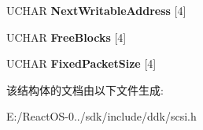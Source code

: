 \begin{DoxyCompactItemize}
U\+C\+H\+AR {\bfseries Next\+Writable\+Address} \mbox{[}4\mbox{]}
\item 
\mbox{\label{struct___t_r_a_c_k___i_n_f_o_r_m_a_t_i_o_n_a4725654dca55e4bee17f53da2cf9e42f}} 
U\+C\+H\+AR {\bfseries Free\+Blocks} \mbox{[}4\mbox{]}
\item 
\mbox{\label{struct___t_r_a_c_k___i_n_f_o_r_m_a_t_i_o_n_a634258f22bd9189def53ac173656807b}} 
U\+C\+H\+AR {\bfseries Fixed\+Packet\+Size} \mbox{[}4\mbox{]}
\end{DoxyCompactItemize}


该结构体的文档由以下文件生成\+:\begin{DoxyCompactItemize}
\item 
E\+:/\+React\+O\+S-\/0../sdk/include/ddk/scsi.\+h\end{DoxyCompactItemize}
